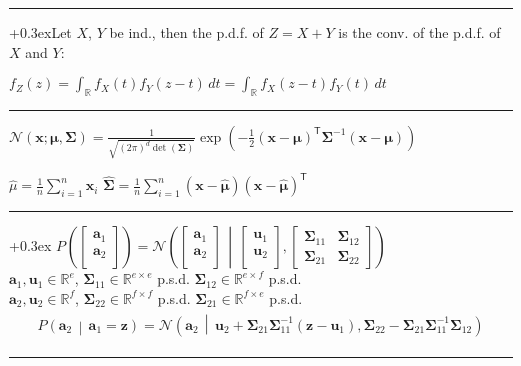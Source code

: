\documentclass[a4paper,10pt,twoside]{extarticle}
\newcommand{\R}{\mathbb{R}}
\newcommand{\cN}{\mathcal{N}}
\newcommand{\Prob}[2][]{P_{#1}\left( #2 \right)}
\newcommand{\cProb}[2]{P\left( #1 \,\middle|\, #2 \right)}
\newcommand{\cDist}[3]{#1\left( #2 \,\middle|\, #3 \right)}
\newcommand*{\T}{\mathsf{T}}
\newcommand{\mat}[1]{\mathbf{#1}}
\renewcommand{\vec}[1]{\mathbf{#1}}
\newcommand{\va}{\vec{a}}
\newcommand{\vu}{\vec{u}}
\newcommand{\vx}{\vec{x}}
\newcommand{\vz}{\vec{z}}
\newcommand{\vmu}{\boldsymbol{\mu}}
\newcommand{\MSigma}{\mat{\Sigma}}
\newcommand{\emptyarg}[1][]{\ifthenelse{\isempty{#1}}{}{\ (#1)}}
\newcommand{\Thm}[1][]{%
\color{custtitlecolor}{\textbf{T.\emptyarg[#1]}}
\kern+0.3ex}
\newcommand{\sep}{\vspace{0pt}\noindent\hrule\vspace{0pt}}
\begin{document}
\begin{landscape}
\begin{multicols*}{3}
\sep

\Thm Let $X$, $Y$ be ind., then the p.d.f. of $Z=X+Y$ is the conv.
of the p.d.f. of $X$ and $Y$:

$
f_Z(z) = \int_{\R} f_X(t)f_Y(z-t) \,dt
= \int_{\R} f_X(z-t)f_Y(t) \,dt
$

\sep

$
\cN(\vx;\vmu,\MSigma)
=
\frac{1}{\sqrt{(2\pi)^d\det(\MSigma)}}
\exp\left(-\frac{1}{2}(\vx-\vmu)^\T\MSigma^{-1}
(\vx-\vmu)\right)
$

\begin{comment}
$
\cN(\vx;\vmu,\MSigma^{-1})
\propto
\exp\left(\frac{1}{2}(\vx-\vmu)^\T\MSigma(\vx-\vmu)\right)
$
\end{comment}

$
\hat{\mu}=\frac{1}{n}\sum_{i=1}^n \vx_i
$
\quad
$
\hat{\MSigma}=\frac{1}{n}\sum_{i=1}^n
(\vx-\hat{\vmu})(\vx-\hat{\vmu})^\T
$

\sep

\Thm
$
\Prob{
\begin{bmatrix}
\va_1\\
\va_2\\
\end{bmatrix}
}
=
\cDist{\cN}{
\begin{bmatrix}
\va_1\\
\va_2\\
\end{bmatrix}
}{
\begin{bmatrix}
\vu_1\\
\vu_2\\
\end{bmatrix},
\begin{bmatrix}
\MSigma_{11} & \MSigma_{12}\\
\MSigma_{21} & \MSigma_{22}
\end{bmatrix}
}
$\\
$\va_1,\vu_1\in\R^{e}$, $\MSigma_{11}\in\R^{e\times e}$ p.s.d.
$\MSigma_{12}\in\R^{e\times f}$ p.s.d.\\
$\va_2,\vu_2\in\R^{f}$, $\MSigma_{22}\in\R^{f\times f}$ p.s.d.
$\MSigma_{21}\in\R^{f\times e}$ p.s.d.\\
\begin{gather*}
\begin{align*}
\cProb{\va_2}{\va_1=\vz}
=
\cDist{\cN}{
\va_2
}{
\vu_2+\MSigma_{21}\MSigma_{11}^{-1}(\vz-\vu_1)
,
\MSigma_{22}-\MSigma_{21}\MSigma_{11}^{-1}\MSigma_{12}
}
\end{align*}
\end{gather*}

\sep


\end{multicols*}
\end{landscape}
\end{document}
